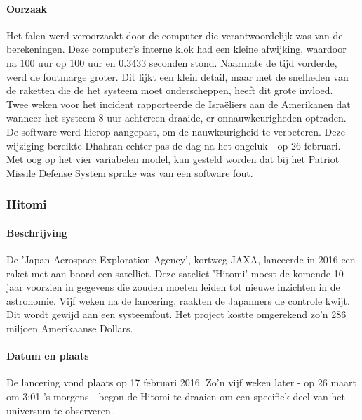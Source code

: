 \documentclass{article}
\begin{document}
				\paragraph{Oorzaak}

					Het falen werd veroorzaakt door de computer die verantwoordelijk was van de berekeningen. Deze computer's interne klok had een kleine afwijking, waardoor na 100 uur op 100 uur en 0.3433 seconden stond. Naarmate de tijd vorderde, werd de foutmarge groter. \cite{skeel1992roundoff} Dit lijkt een klein detail, maar met de snelheden van de raketten die de het systeem moet onderscheppen, heeft dit grote invloed.  \\
					Twee weken voor het incident rapporteerde de Israëliers aan de Amerikanen dat wanneer het systeem 8 uur achtereen draaide, er onnauwkeurigheden optraden. De software werd hierop aangepast, om de nauwkeurigheid te verbeteren. Deze wijziging bereikte Dhahran echter pas de dag na het ongeluk - op 26 februari. \cite{general1992patriot} \\
					Met oog op het vier variabelen model, kan gesteld worden dat bij het Patriot Missile Defense System sprake was van een software fout. \par
			
			\subsubsection{Hitomi}

				\paragraph{Beschrijving}

					De 'Japan Aerospace Exploration Agency', kortweg JAXA, lanceerde in 2016 een raket met aan boord een satelliet. Deze sateliet 'Hitomi' moest de komende 10 jaar voorzien in gegevens die zouden moeten leiden tot nieuwe inzichten in de astronomie. Vijf weken na de lancering, raakten de Japanners de controle kwijt. Dit wordt gewijd aan een systeemfout. Het project kostte omgerekend zo'n 286 miljoen Amerikaanse Dollars.

				\paragraph{Datum en plaats}

					De lancering vond plaats op 17 februari 2016. Zo'n vijf weken later - op 26 maart om 3:01 's morgens - begon de Hitomi te draaien om een specifiek deel van het universum te observeren.
\end{document}
